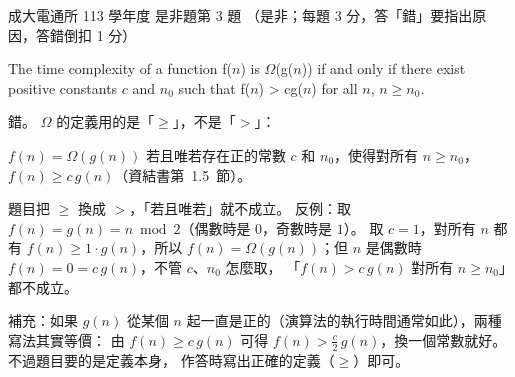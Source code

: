 \begin{pastexam}[label={px:ncku-113-cce-03}]{成大電通所 113 學年度 是非題第 3 題}
（是非；每題 3 分，答「錯」要指出原因，答錯倒扣 1 分）

The time complexity of a function f($n$) is $\Omega$(g($n$)) if and only if there exist
positive constants $c$ and $n_0$ such that f($n$) > cg($n$) for all $n$, $n\ge n_0$.
\end{pastexam}

\begin{pastsoln}
錯。 $\Omega$ 的定義用的是「$\ge$」，不是「$>$」：

$f(n) = \Omega(g(n))$ 若且唯若存在正的常數 $c$ 和 $n_0$，使得對所有 $n \ge n_0$，
$f(n) \ge c\,g(n)$（資結書第~1.5~節）。

題目把 $\ge$ 換成 $>$，「若且唯若」就不成立。 反例：取 $f(n) = g(n) = n \bmod 2$（偶數時是
$0$，奇數時是 $1$）。 取 $c = 1$，對所有 $n$ 都有 $f(n) \ge 1 \cdot g(n)$，所以
$f(n) = \Omega(g(n))$；但 $n$ 是偶數時 $f(n) = 0 = c\,g(n)$，不管 $c$、$n_0$ 怎麼取，
「$f(n) > c\,g(n)$ 對所有 $n \ge n_0$」都不成立。

補充：如果 $g(n)$ 從某個 $n$ 起一直是正的（演算法的執行時間通常如此），兩種寫法其實等價：
由 $f(n) \ge c\,g(n)$ 可得 $f(n) > \frac{c}{2}\,g(n)$，換一個常數就好。 不過題目要的是定義本身，
作答時寫出正確的定義（$\ge$）即可。
\end{pastsoln}
